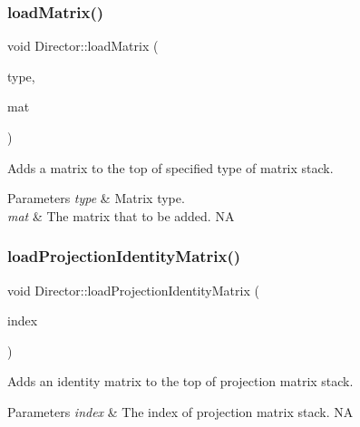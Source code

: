 \subsubsection{\texorpdfstring{load\+Matrix()}{loadMatrix()}\hspace{0.1cm}{\footnotesize\ttfamily [2/2]}}
{\footnotesize\ttfamily void Director\+::load\+Matrix (\begin{DoxyParamCaption}\item[{\hyperlink{group__base_ga4d146cef7130a8f3a953d46964ea3905}{M\+A\+T\+R\+I\+X\+\_\+\+S\+T\+A\+C\+K\+\_\+\+T\+Y\+PE}}]{type,  }\item[{const \hyperlink{classMat4}{Mat4} \&}]{mat }\end{DoxyParamCaption})}

Adds a matrix to the top of specified type of matrix stack.


\begin{DoxyParams}{Parameters}
{\em type} & Matrix type. \\
\hline
{\em mat} & The matrix that to be added.  NA \\
\hline
\end{DoxyParams}
\mbox{\label{classDirector_a03fb01ab412fed87f3fc86ce08f775be}} 
\subsubsection{\texorpdfstring{load\+Projection\+Identity\+Matrix()}{loadProjectionIdentityMatrix()}}
{\footnotesize\ttfamily void Director\+::load\+Projection\+Identity\+Matrix (\begin{DoxyParamCaption}\item[{size\+\_\+t}]{index }\end{DoxyParamCaption})}

Adds an identity matrix to the top of projection matrix stack. 
\begin{DoxyParams}{Parameters}
{\em index} & The index of projection matrix stack.  NA \\
\hline
\end{DoxyParams}
\mbox{\label{classDirector_aafa89a3617de480ba2370294fb2f809c}} 

